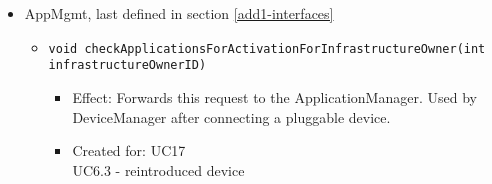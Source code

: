 {{{\begin{itemize}
\begin{itemize}
                    \begin{itemize}
                        \item Effect: Lets the gateway know that a pluggable device has been reactivated in the system.
                              This will generate a notification for an infrastructure owner.
                        \item Created for: UC6.3
                    \end{itemize}
                \item \texttt{void setConfig(PluggableDeviceID pID, Map<String, String> config)}
                    \begin{itemize}
                        \item Now also used for UC6.3 - reintroduced device
                    \end{itemize}
                \item \texttt{Map<String, String> getConfigDB(PluggableDeviceID pID)}
                    \begin{itemize}
                        \item Effect: Sends a DB query to the DeviceDataScheduler to get the last set configuration of a pluggable device.
                        \item Created for: UC6.3 - reintroduced device
                    \end{itemize}
            \end{itemize}

            \item AppMgmt, last defined in section \ref{add1-interfaces}
                \begin{itemize}
                    \item \texttt{void checkApplicationsForActivationForInfrastructureOwner(int infrastructureOwnerID)}
                        \begin{itemize}
                			\item Effect: Forwards this request to the ApplicationManager.
                                  Used by DeviceManager after connecting a pluggable device.
                			\item Created for: UC17 \\  UC6.3 - reintroduced device
                        \end{itemize}
                \end{itemize}
        \end{itemize}

}}}
